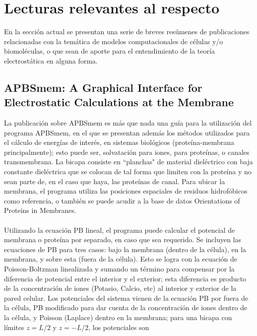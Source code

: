 \documentclass[12pt, notitlepage]{article}
\begin{document}



\section{Lecturas relevantes al respecto}
En la sección actual se presentan una serie de breves resúmenes de publicaciones relacionadas con la temática de modelos computacionales de células y/o biomoléculas, o que sean de aporte para el entendimiento de la teoría electrostática en alguna forma.
\subsection{APBSmem: A Graphical Interface for Electrostatic Calculations at the Membrane \cite{APBSmem}}
La publicación sobre APBSmem es más que nada una guía para la utilización del programa APBSmem, en el que se presentan además los métodos utilizados para el cálculo de energías de interés, en sistemas biológicos (proteína-membrana principalmente); esto puede ser, solvatación para iones, para proteínas, o canales transmembrana. 
La bicapa consiste en ``planchas" de material dieléctrico con baja constante dieléctrica que se colocan de tal forma que limiten con la proteína y no sean parte de, en el caso que haya, las proteínas de canal. Para ubicar la membrana, el programa utiliza las posiciones espaciales de residuos hidrofóbicos como referencia, o también se puede acudir a la base de datos Orientations of Proteins in Membranes.\\\\
Utilizando la ecuación PB lineal, el programa puede calcular el potencial de membrana o proteína por separado, en caso que sea requerido. Se incluyen las ecuaciones de PB para tres casos: bajo la membrana (dentro de la célula), en la membrana, y sobre esta (fuera de la célula). Esto se logra con la ecuación de Poisson-Boltzman linealizada y sumando un término para compensar por la diferencia de potencial entre el interior y el exterior; esta diferencia es producto de la concentración de iones (Potasio, Calcio, etc) al interior y exterior de la pared celular. Los potenciales del sistema vienen de la ecuación PB por fuera de la célula, PB modificado para dar cuenta de la concentración de iones dentro de la célula, y Poisson (Laplace) dentro en la membrana; para una bicapa con límites $z = L/2$ y $z = -L/2$, los potenciales son
\end{document}

